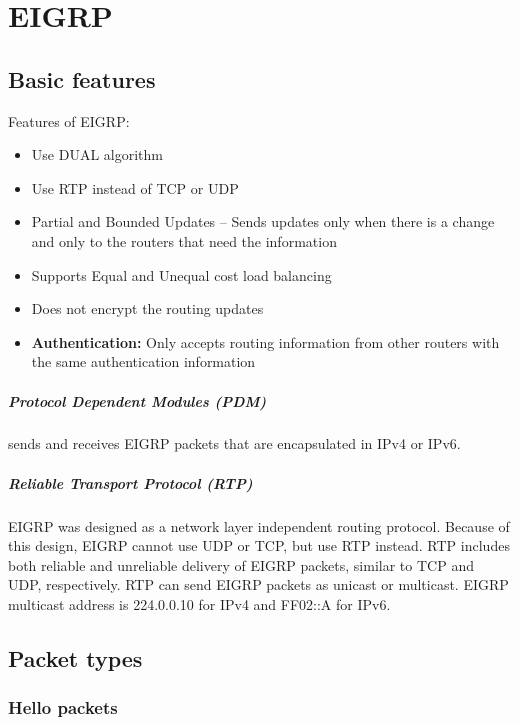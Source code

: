 \chapter{EIGRP}

\section{Basic features}

Features of EIGRP:

\begin{itemize}
\item Use DUAL algorithm
\item Use RTP  instead of TCP or UDP
\item Partial and Bounded Updates -- Sends updates only when there is a change and only to the routers that need the information
\item Supports Equal and Unequal cost load balancing
\item Does not encrypt the routing updates
\item \textbf{Authentication:} Only accepts routing information from other routers with the same authentication information 
\end{itemize}

\paragraph{Protocol Dependent Modules (PDM)}sends and receives EIGRP packets that are encapsulated in IPv4 or IPv6.

\paragraph{Reliable Transport Protocol (RTP)}EIGRP was designed as a network layer independent routing protocol. Because of this design, EIGRP cannot use UDP or TCP, but use RTP instead. RTP includes both reliable and unreliable delivery of EIGRP packets, similar to TCP and UDP, respectively. RTP can send EIGRP packets as unicast or multicast. EIGRP multicast address is 224.0.0.10 for IPv4 and  FF02::A for IPv6.

\section{Packet types}

\subsection{Hello packets}

